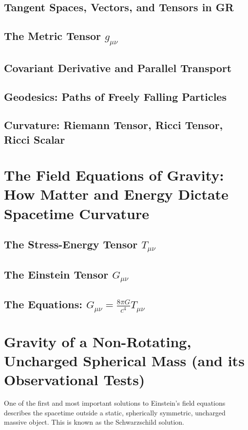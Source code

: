 \documentclass{amsart}
\theoremstyle{definition}
\theoremstyle{remark}
\begin{document}
\subsection{Tangent Spaces, Vectors, and Tensors in GR}
\subsection{The Metric Tensor $g_{\mu\nu}$}
\subsection{Covariant Derivative and Parallel Transport}
\subsection{Geodesics: Paths of Freely Falling Particles}
\subsection{Curvature: Riemann Tensor, Ricci Tensor, Ricci Scalar}

\section{The Field Equations of Gravity: How Matter and Energy Dictate Spacetime Curvature}
\label{sec:efe}
\subsection{The Stress-Energy Tensor $T_{\mu\nu}$}
\subsection{The Einstein Tensor $G_{\mu\nu}$}
\subsection{The Equations: $G_{\mu\nu} = \frac{8\pi G}{c^4} T_{\mu\nu}$}

\section{Gravity of a Non-Rotating, Uncharged Spherical Mass (and its Observational Tests)}
\label{sec:schwarzschild_tests}
One of the first and most important solutions to Einstein's field equations describes the spacetime outside a static, spherically symmetric, uncharged massive object. This is known as the Schwarzschild solution.
\end{document}
